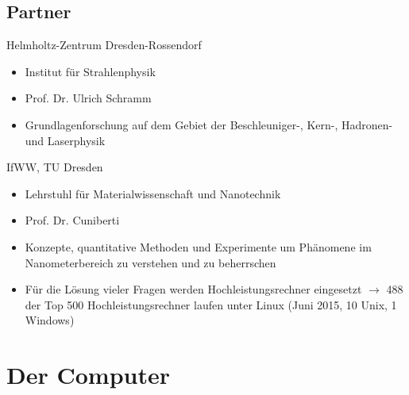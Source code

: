\documentclass[aspectratio=43]{beamer}
\begin{document}
\subsection{Partner}

\begin{frame}
	\begin{block}{Helmholtz-Zentrum Dresden-Rossendorf} 
	\begin{itemize}
	\item Institut für Strahlenphysik  
	\item Prof. Dr. Ulrich Schramm
	\item Grundlagenforschung auf dem Gebiet der Beschleuniger-, Kern-, Hadronen- und Laserphysik
	\end{itemize}
	\end{block}
	
\end{frame}

\begin{frame}
	\begin{block}{IfWW, TU Dresden} 
	\begin{itemize}
	\item Lehrstuhl für Materialwissenschaft und Nanotechnik 
	\item Prof. Dr. Cuniberti
	\item Konzepte, quantitative Methoden und Experimente um Phänomene im Nanometerbereich zu verstehen und zu beherrschen
	\end{itemize}
	\end{block}
		\begin{block}{} 
	\begin{itemize}
	\item Für die Lösung vieler Fragen werden Hochleistungsrechner eingesetzt  $\rightarrow$ 488 der Top 500 Hochleistungsrechner laufen unter Linux (Juni 2015, 10 Unix, 1 Windows) 
	\end{itemize}
	\end{block}
\end{frame}



\section{Der Computer}
\end{document}
